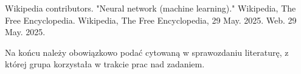 \documentclass{classrep}
\begin{document}
\begin{thebibliography}{0}
	 Wikipedia contributors. "Neural network (machine learning)."
	Wikipedia, The Free Encyclopedia. Wikipedia, The Free Encyclopedia,
	29 May. 2025. Web. 29 May. 2025. \end{thebibliography}

{\color{blue}
Na końcu należy obowiązkowo podać cytowaną w sprawozdaniu literaturę, z której
grupa korzystała w trakcie prac nad zadaniem.}
\end{document}
